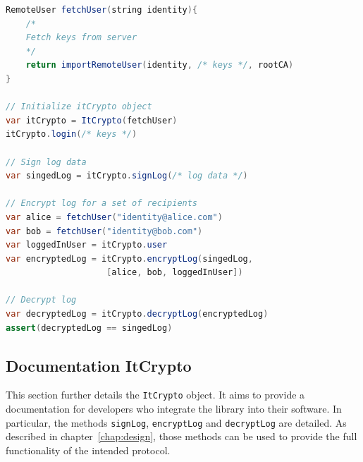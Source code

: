 \documentclass[../main.tex]{subfiles}
\begin{document}
\begin{lstlisting}[label=lst:pseudocode,float,floatplacement=tbp, language=Java, caption={Pseudocode of creating, encrypting and decrypting logs using the provided libraries.}, morekeywords={RemoteUser, var, assert}, commentstyle=\color{codegreen}]
RemoteUser fetchUser(string identity){
    /*
    Fetch keys from server
    */
    return importRemoteUser(identity, /* keys */, rootCA)
}

// Initialize itCrypto object
var itCrypto = ItCrypto(fetchUser)
itCrypto.login(/* keys */)

// Sign log data
var singedLog = itCrypto.signLog(/* log data */)

// Encrypt log for a set of recipients
var alice = fetchUser("identity@alice.com")
var bob = fetchUser("identity@bob.com")
var loggedInUser = itCrypto.user
var encryptedLog = itCrypto.encryptLog(singedLog, 
                    [alice, bob, loggedInUser])

// Decrypt log
var decryptedLog = itCrypto.decryptLog(encryptedLog)
assert(decryptedLog == singedLog)
\end{lstlisting}

\subsection{Documentation ItCrypto}
This section further details the \verb|ItCrypto| object.
It aims to provide a documentation for developers who integrate the library into their software.
In particular, the methods \verb|signLog|, \verb|encryptLog| and \verb|decryptLog| are detailed.
As described in chapter~\ref{chap:design}, those methods can be used to provide the full functionality of the intended protocol.
\end{document}
